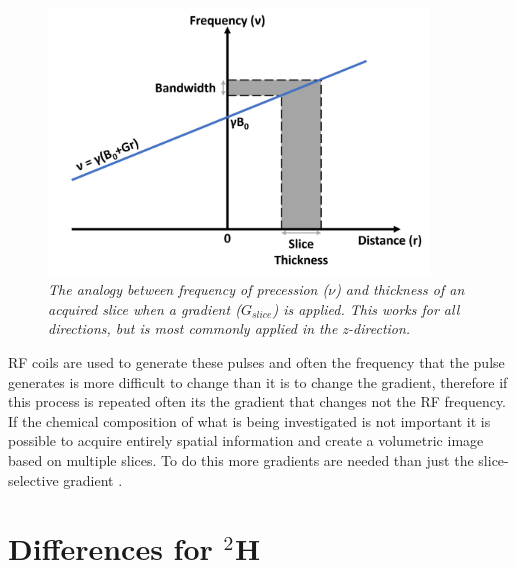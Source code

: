 \begin{figure}
    \centering
    \includegraphics[width=0.9\textwidth]{Figures/Theory/Gradient.png}
    \caption{\textit{The analogy between frequency of precession ($\nu$) and thickness of an acquired slice when a gradient ($G_{slice}$) is applied. This works for all directions, but is most commonly applied in the z-direction.}}
    \label{fig:theory:Grad}
\end{figure}

\ac{RF} coils are used to generate these pulses and often the frequency that the pulse generates is more difficult to change than it is to change the gradient, therefore if this process is repeated often its the gradient that changes not the \ac{RF} frequency. If the chemical composition of what is being investigated is not important it is possible to acquire entirely spatial information and create a volumetric image based on multiple slices. To do this more gradients are needed than just the slice-selective gradient \cite{deGraaf2019InSpectroscopy}.

\section{Differences for $^2$H}

